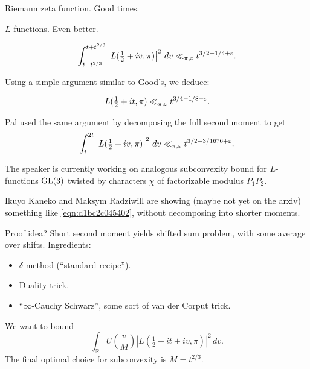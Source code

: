 \documentclass[reqno]{amsart} 
\begin{document}
Riemann zeta function.  Good times.

$L$-functions.  Even better.

\begin{theorem}

\begin{equation*}
  \int_{t - t^{2/3} }^{t + t^{2/3} }
  \left\lvert L (\tfrac{1}{2} + i v, \pi ) \right\rvert^2 \, d v
  \ll_{\pi, \varepsilon }
  t^{3/2 - 1/4 + \varepsilon }.
\end{equation*}
\end{theorem}
Using a simple argument similar to Good's, we deduce:
\begin{corollary}
  \begin{equation*}
    L (\tfrac{1}{2} + i t, \pi ) \ll_{\pi, \varepsilon } t^{3/4 - 1 / 8 + \varepsilon}.
  \end{equation*}
\end{corollary}
\begin{remark}
  Pal used the same argument by decomposing the full second moment to get
  \begin{equation}\label{eqn:d1bc2c045402}
    \int_t^{2 t } \left\lvert L (\tfrac{1}{2} + i v, \pi ) \right\rvert^2 \, d v \ll_{\pi, \varepsilon } t^{3/2 - 3 / 1676 + \varepsilon }.
  \end{equation}
\end{remark}
\begin{remark}
  The speaker is currently working on analogous subconvexity bound for $L$-functions $\operatorname{GL}(3)$ twisted by characters $\chi$ of factorizable modulus $P_1 P_2$.
\end{remark}
\begin{remark}
  Ikuyo Kaneko and Maksym Radziwill are showing (maybe not yet on the arxiv) something like \eqref{eqn:d1bc2c045402}, without decomposing into shorter moments.
\end{remark}

Proof idea?  Short second moment yields shifted sum problem, with some average over shifts.  Ingredients:
\begin{itemize}
\item $\delta$-method (``standard recipe'').
\item Duality trick.
\item ``$\infty$-Cauchy Schwarz'', some sort of van der Corput trick.
\end{itemize}
We want to bound
\begin{equation*}
  \int_{\mathbb{R} } U \left( \frac{v}{M} \right)
  \left\lvert L (\tfrac{1}{2} + i t + i v, \pi ) \right\rvert^2 \, d v.
\end{equation*}
The final optimal choice for subconvexity is $M = t^{2/3}$.
\end{document}
